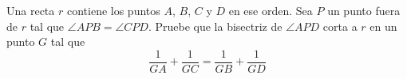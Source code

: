 Una recta $r$ contiene los puntos $A$, $B$, $C$ y $D$ en ese orden. Sea $P$ un punto fuera de $r$ tal que $\angle APB = \angle CPD$. Pruebe que la bisectriz de $\angle APD$ corta a $r$ en un punto $G$ tal que
\[ \frac{1}{GA} + \frac{1}{GC} = \frac{1}{GB} + \frac{1}{GD} \]

